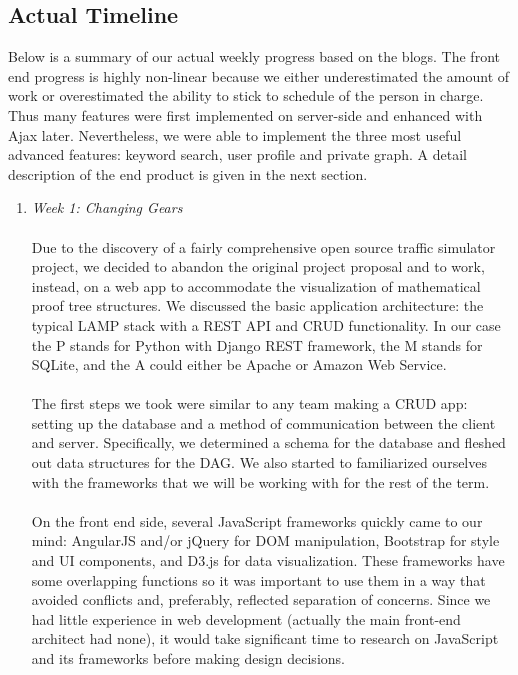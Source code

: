 \documentclass{acm_proc_article-sp}
\begin{document}
\subsection{Actual Timeline}
Below is a summary of our actual weekly progress based on the blogs. The front end progress is highly non-linear because we either underestimated the amount of work or overestimated the ability to stick to schedule of the person in charge. Thus many features were first implemented on server-side and enhanced with Ajax later. Nevertheless, we were able to implement the three most useful advanced features: keyword search, user profile and private graph. A detail description of the end product is given in the next section.
\begin{enumerate}
\item \emph{Week 1: Changing Gears}\\\\
Due to the discovery of a fairly comprehensive open source traffic simulator project, we decided to abandon the original project proposal and to work, instead, on a web app to accommodate the visualization of mathematical proof tree structures. We discussed the basic application architecture: the typical LAMP stack with a REST API and CRUD functionality. In our case the P stands for Python	with Django REST framework, the M stands for SQLite, and the A could either be Apache or Amazon Web Service.\\\\
The first steps we took were similar to any team making a CRUD app: setting up the database and a method of communication between the client and server. Specifically, we determined a schema for the database and fleshed out data structures for the DAG. We also started to familiarized ourselves with the frameworks that we will be working with for the rest of the term.\\\\
On the front end side, several JavaScript frameworks quickly came to our mind:
AngularJS and/or jQuery for DOM manipulation, Bootstrap for style and UI components, and D3.js for data visualization. These frameworks have some overlapping functions so it was important to use them in a way that avoided conflicts and, preferably, reflected separation of concerns. Since we had little experience in web development (actually the main front-end architect had none), it would take significant time to research on JavaScript and its frameworks before making design decisions.\\\\


\end{enumerate}
\end{document}
